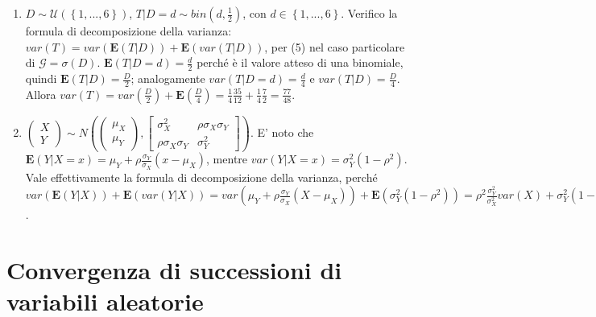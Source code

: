 \documentclass{article}
\begin{document}
\begin{enumerate}
\item $D\sim \mathcal{U}\left( \left\{ 1,...,6\right\} \right) $, $T|D=d\sim
bin\left( d,\frac{1}{2}\right) $, con $d\in \left\{ 1,...,6\right\} $.
Verifico la formula di decomposizione della varianza: $var\left( T\right)
=var\left( \mathbf{E}\left( T|D\right) \right) +\mathbf{E}\left( var\left(
T|D\right) \right) $, per (5) nel caso particolare di $\mathcal{G}=\sigma
\left( D\right) $. $\mathbf{E}\left( T|D=d\right) =\frac{d}{2}$ perch\'{e} 
\`{e} il valore atteso di una binomiale, quindi $\mathbf{E}\left( T|D\right)
=\frac{D}{2}$; analogamente $var\left( T|D=d\right) =\frac{d}{4}$ e $%
var\left( T|D\right) =\frac{D}{4}$. Allora $var\left( T\right) =var\left( 
\frac{D}{2}\right) +\mathbf{E}\left( \frac{D}{4}\right) =\frac{1}{4}\frac{35%
}{12}+\frac{1}{4}\frac{7}{2}=\allowbreak \frac{77}{48}$.

\item $\left( 
\begin{array}{c}
X \\ 
Y%
\end{array}%
\right) \sim N\left( \left( 
\begin{array}{c}
\mu _{X} \\ 
\mu _{Y}%
\end{array}%
\right) ,\left[ 
\begin{array}{cc}
\sigma _{X}^{2} & \rho \sigma _{X}\sigma _{Y} \\ 
\rho \sigma _{X}\sigma _{Y} & \sigma _{Y}^{2}%
\end{array}%
\right] \right) $. E' noto che $\mathbf{E}\left( Y|X=x\right) =\mu _{Y}+\rho 
\frac{\sigma _{Y}}{\sigma _{X}}\left( x-\mu _{X}\right) $, mentre $var\left(
Y|X=x\right) =\sigma _{Y}^{2}\left( 1-\rho ^{2}\right) $. Vale
effettivamente la formula di decomposizione della varianza, perch\'{e} $%
var\left( \mathbf{E}\left( Y|X\right) \right) +\mathbf{E}\left( var\left(
Y|X\right) \right) =var\left( \mu _{Y}+\rho \frac{\sigma _{Y}}{\sigma _{X}}%
\left( X-\mu _{X}\right) \right) +\mathbf{E}\left( \sigma _{Y}^{2}\left(
1-\rho ^{2}\right) \right) =\rho ^{2}\frac{\sigma _{Y}^{2}}{\sigma _{X}^{2}}%
var\left( X\right) +\sigma _{Y}^{2}\left( 1-\rho ^{2}\right) =\sigma
_{Y}^{2} $.
\end{enumerate}

\section{Convergenza di successioni di variabili aleatorie}
\end{document}
